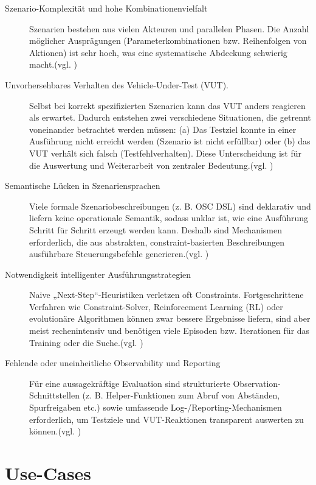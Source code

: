 \begin{description}
    \item[Szenario-Komplexität und hohe Kombinationenvielfalt] Szenarien bestehen aus vielen Akteuren und parallelen Phasen. Die Anzahl möglicher Ausprägungen (Parameterkombinationen bzw. Reihenfolgen von Aktionen) ist sehr hoch, was eine systematische Abdeckung schwierig macht.(vgl. \cite{EinfuehrungIntegrationsprojekt})
    \item[Unvorhersehbares Verhalten des Vehicle-Under-Test (VUT).] Selbst bei korrekt spezifizierten Szenarien kann das VUT anders reagieren als erwartet. Dadurch entstehen zwei verschiedene Situationen, die getrennt voneinander betrachtet werden müssen: (a) Das Testziel konnte in einer Ausführung nicht erreicht werden (Szenario ist nicht erfüllbar) oder (b) das VUT verhält sich falsch (Testfehlverhalten). Diese Unterscheidung ist für die Auswertung und Weiterarbeit von zentraler Bedeutung.(vgl. \cite{EinfuehrungIntegrationsprojekt})
    \item[Semantische Lücken in Szenariensprachen] Viele formale Szenariobeschreibungen (z. B. OSC DSL) sind deklarativ und liefern keine operationale Semantik, sodass unklar ist, wie eine Ausführung Schritt für Schritt erzeugt werden kann. Deshalb sind Mechanismen erforderlich, die aus abstrakten, constraint-basierten Beschreibungen ausführbare Steuerungsbefehle generieren.(vgl. \cite{EinfuehrungIntegrationsprojekt})
    \item[Notwendigkeit intelligenter Ausführungsstrategien] Naive „Next-Step“-Heuristiken verletzen oft Constraints. Fortgeschrittene Verfahren wie Constraint-Solver, Reinforcement Learning (RL) oder evolutionäre Algorithmen können zwar bessere Ergebnisse liefern, sind aber meist rechenintensiv und benötigen viele Episoden bzw. Iterationen für das Training oder die Suche.(vgl. \cite{EinfuehrungIntegrationsprojekt})
    \item[Fehlende oder uneinheitliche Observability und Reporting] Für eine aussagekräftige Evaluation sind strukturierte Observation-Schnittstellen (z. B. Helper-Funktionen zum Abruf von Abständen, Spurfreigaben etc.) sowie umfassende Log-/Reporting-Mechanismen erforderlich, um Testziele und VUT-Reaktionen transparent auswerten zu können.(vgl. \cite{EinfuehrungIntegrationsprojekt})
\end{description}

\section{Use-Cases}

